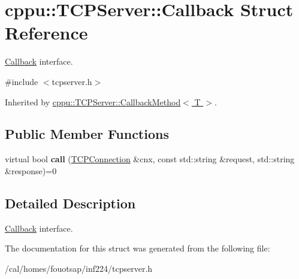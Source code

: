 \hypertarget{structcppu_1_1_t_c_p_server_1_1_callback}{\section{cppu\+:\+:T\+C\+P\+Server\+:\+:Callback Struct Reference}
\label{structcppu_1_1_t_c_p_server_1_1_callback}
}


\hyperlink{structcppu_1_1_t_c_p_server_1_1_callback}{Callback} interface.  




{\ttfamily \#include $<$tcpserver.\+h$>$}



Inherited by \hyperlink{structcppu_1_1_t_c_p_server_1_1_callback_method}{cppu\+::\+T\+C\+P\+Server\+::\+Callback\+Method$<$ T $>$}.

\subsection*{Public Member Functions}
\begin{DoxyCompactItemize}
\item 
\hypertarget{structcppu_1_1_t_c_p_server_1_1_callback_aabe4b0b30e14ddeb7c0c02aa3a335eba}{virtual bool {\bfseries call} (\hyperlink{classcppu_1_1_t_c_p_connection}{T\+C\+P\+Connection} \&cnx, const std\+::string \&request, std\+::string \&response)=0}\label{structcppu_1_1_t_c_p_server_1_1_callback_aabe4b0b30e14ddeb7c0c02aa3a335eba}

\end{DoxyCompactItemize}


\subsection{Detailed Description}
\hyperlink{structcppu_1_1_t_c_p_server_1_1_callback}{Callback} interface. 

The documentation for this struct was generated from the following file\+:\begin{DoxyCompactItemize}
\item 
/cal/homes/fouotsap/inf224/tcpserver.\+h\end{DoxyCompactItemize}
